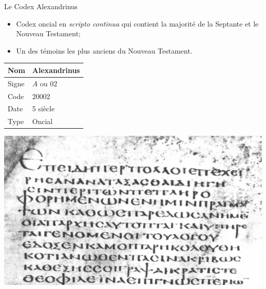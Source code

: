 \documentclass[11pt]{beamer}
\begin{document}


\begin{frame}{Le Codex Alexandrinus}
\begin{block}{}
    \begin{itemize}
        \item Codex oncial en \textit{scripto continua} qui contient la majorité de la Septante et le Nouveau Testament;
        \item Un des témoins les plus anciens du Nouveau Testament.
    \end{itemize}
\end{block}
    \vfill


\begin{minipage}{.45\textwidth}
\begin{tabular}{l|l}
     Nom & Alexandrinus \\
     \hline
     Signe & $A$ ou 02 \\
     \hline
     Code & 20002\\
     \hline
     Date & 5\ieme{} siècle \\
     \hline
     Type & Oncial \\
\end{tabular}
\end{minipage}
\hfill
\begin{minipage}{.45\textwidth}
    \includegraphics[scale=.4]{img/alexandrinus_lk_11.png}
\end{minipage}

\end{frame}
\end{document}
